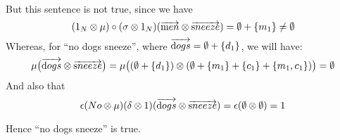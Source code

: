 \noindent
But this sentence is not true, since we have 
\[
(1_N \otimes \mu) \circ (\sigma \otimes 1_N)(\overrightarrow{\text men} \otimes \overrightarrow{\text sneeze})   = \emptyset + \{m_1\} \neq \emptyset
\]
Whereas, for  ``no dogs sneeze'', where $\overrightarrow{\text dogs} = \emptyset + \{d_1\}$, we will have:
\[
\mu\big(\overrightarrow{\text dogs} \otimes \overrightarrow{\text sneeze}\big) = \mu \big((\emptyset + \{d_1\}) \otimes (\emptyset + \{m_1\} + \{c_1\} + \{m_1, c_1\})\big) = \emptyset
\]
And also that 
\[\epsilon(No \otimes \mu) (\delta \otimes 1)(\overrightarrow{\text dogs} \otimes \overrightarrow{\text sneeze}) =
\epsilon(\emptyset \otimes \emptyset) = 1
\]

\noindent
Hence ``no dogs sneeze'' is true. 

